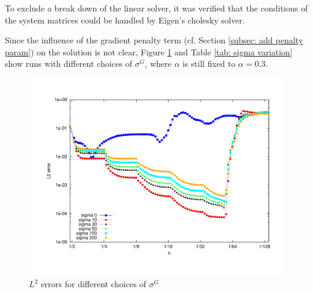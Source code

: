  To exclude a break down of the linear solver, it was verified that the conditions of the system matrices could be handled by Eigen's cholesky solver.

Since the influence of the gradient penalty term (cf. Section \ref{subsec: add penalty param}) on the solution is not clear, Figure \ref{fig: sigma variation} and Table \ref{tab: sigma variation} show runs with different choices of $\sigma^G$, where $\alpha$ is still fixed to $\alpha=0.3$.
\begin{figure}[H]
	\centering
	\includegraphics[scale =0.4]{plots/MA1_deg2_sigma.pdf}
	\caption{$L^2$ errors for different choices of $\sigma^G$}
	\label{fig: sigma variation}
\end{figure}


